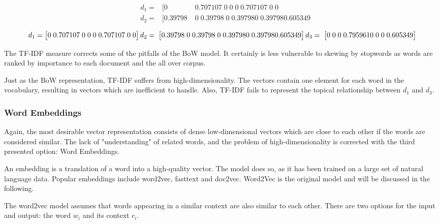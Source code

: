 				
		\begin{align}
			&d_1 = & [ 0\;	&0.707107\;	0\;	0\;	0\;	0.707107\;	0\;	0 \\
			&d_2 = & [ 0.39798\;	&0\;	0.39798\;	0\;	0.39798	0\;	0.39798	0.605349 
		\end{align}
			
			\[d_1 = \begin{bmatrix} 0\;	0.707107\;	0\;	0\;	0\;	0.707107\;	0\;	0 \end{bmatrix}	 \\
			d_2 =  \;\begin{bmatrix} 0.39798\;	0\;	0.39798\;	0\;	0.39798	0\;	0.39798	0.605349 \end{bmatrix} \\
			d_3 = \;\begin{bmatrix} 0\;	0\;	0\;	0.795961	0\;	0\;	0\;	0.605349 \end{bmatrix} \]
			
		The \ac{TF-IDF} measure corrects some of the pitfalls of the \ac{BoW} model. It certainly is less vulnerable to skewing by stopwords as words are ranked by importance to each document and the all over corpus. 
		
		Just as the \ac{BoW} representation, \ac{TF-IDF} suffers from high-dimensionality. The vectors contain one element for each word in the vocabulary, resulting in vectors which are inefficient to handle.
		Also, \ac{TF-IDF} fails to represent the topical relationship between $ d_{1} $ and $ d_{3}$. 
		
		\subsubsection{Word Embeddings}
		 Again, the most desirable vector representation consists of dense low-dimensional vectors which are close to each other if the words are considered similar. The lack of "understanding" of related words, and the problem of high-dimensionality is corrected with the third presented option: Word Embeddings.
		
		An embedding is a translation of a word into a high-quality vector. The model does so, as it has been trained on a large set of natural language data. Popular embeddings include word2vec, fasttext and doc2vec. Word2Vec is the original model and will be discussed in the following. 
		
		The word2vec model assumes that words appearing in a similar context are also similar to each other. There are two options for the input and output: the word $w_i$ and its context $c_i$.
		

